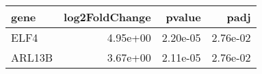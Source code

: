 \begin{tabular}{lrrr}
\toprule
  gene &  log2FoldChange &   pvalue &     padj \\
\midrule
  ELF4 &        4.95e+00 & 2.20e-05 & 2.76e-02 \\
ARL13B &        3.67e+00 & 2.11e-05 & 2.76e-02 \\
\bottomrule
\end{tabular}
